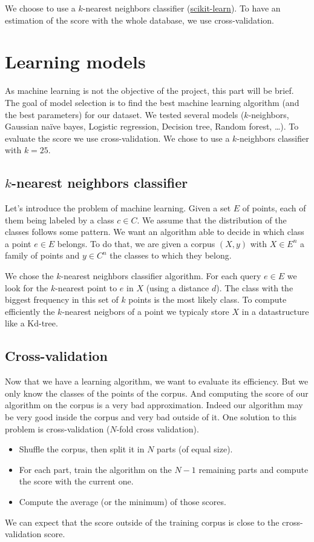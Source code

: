 \documentclass[a4paper, 11pt]{article}
\begin{document}
\noindent We choose to use a $k$-nearest neighbors classifier (\href{http://scikit-learn.org/stable/modules/generated/sklearn.neighbors.KNeighborsClassifier.html}{scikit-learn}).
To have an estimation of the score with the whole database, we use cross-validation.

\newpage
\section{Learning models}

As machine learning is not the objective of the project, this part will be brief. The goal of model selection is to find the best machine learning algorithm (and the best parameters) for our dataset. We tested several models ($k$-neighbors, Gaussian naïve bayes, Logistic regression, Decision tree, Random forest, \dots). To evaluate the score we use cross-validation. We chose to use a $k$-neighbors classifier with $k= 25$.


\subsection{$k$-nearest neighbors classifier}

Let's introduce the problem of machine learning. Given a set $E$ of points, each of them being labeled by a class $c \in C$. We assume that the distribution of the classes follows some pattern. We want an algorithm able to decide in which class a point $e \in E$ belongs. To do that, we are given a corpus $(X, y)$ with $X \in E^n$ a family of points and $y \in C^n$ the classes to which they belong. 

We chose the $k$-nearest neighbors classifier algorithm. For each query $e \in E$ we look for the $k$-nearest point to $e$ in $X$ (using a distance $d$). The class with the biggest frequency in this set of $k$ points is the most likely class. To compute efficiently the $k$-nearest neigbors of a point we typicaly store $X$ in a datastructure like a Kd-tree.

\subsection{Cross-validation}

Now that we have a learning algorithm, we want to evaluate its efficiency. But we only know the classes of the points of the corpus. And computing the score of our algorithm on the corpus is a very bad approximation. Indeed our algorithm may be very good inside the corpus and very bad outside of it. One solution to this problem is cross-validation ($N$-fold cross validation).
\begin{itemize}
	\item Shuffle the corpus, then split it in $N$ parts (of equal size).
	\item For each part, train the algorithm on the $N-1$ remaining parts and compute the score with the current one.
	\item Compute the average (or the minimum) of those scores.
\end{itemize}
We can expect that the score outside of the training corpus is close to the cross-validation score.
\end{document}

